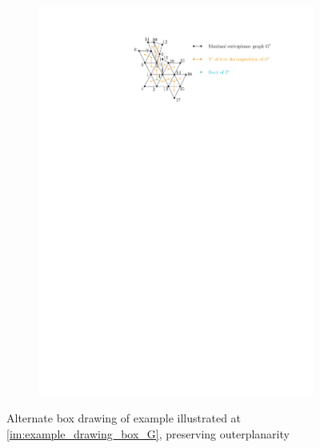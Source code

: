 \begin{figure}[H]
	\centering
	\begin{subfigure}{\textwidth}
		\centering
		\includegraphics[page=9,width=0.5\linewidth]{graphics/maximal_outerplanar_example_drawings.pdf}
	\end{subfigure}
	\caption{Alternate box drawing of example illustrated at \ref{im:example_drawing_box_G}, preserving outerplanarity}
\end{figure}